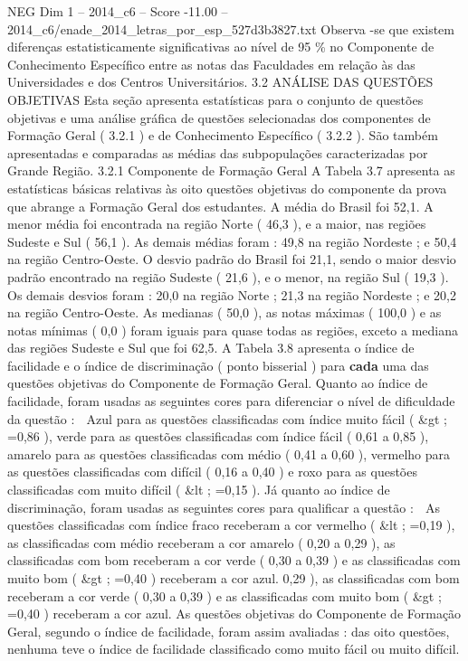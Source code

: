 \begin{textsample}{NEG Dim 1 – 2014\_c6 – Score -11.00 – 2014\_c6/enade\_2014\_letras\_por\_esp\_527d3b3827.txt}
Observa -se que existem diferenças estatisticamente significativas ao nível de 95 \% no Componente de Conhecimento Específico entre as notas das Faculdades em relação às das Universidades e dos Centros Universitários. 3.2 ANÁLISE DAS QUESTÕES OBJETIVAS Esta seção apresenta estatísticas para o conjunto de questões objetivas e uma análise gráfica de questões selecionadas dos componentes de Formação Geral ( 3.2.1 ) e de Conhecimento Específico ( 3.2.2 ).
São também apresentadas e comparadas as médias das subpopulações caracterizadas por Grande Região. 3.2.1 Componente de Formação Geral A Tabela 3.7 apresenta as estatísticas básicas relativas às oito questões objetivas do componente da prova que abrange a Formação Geral dos estudantes.
A média do Brasil foi 52,1.
A menor média foi encontrada na região Norte ( 46,3 ), e a maior, nas regiões Sudeste e Sul ( 56,1 ).
As demais médias foram : 49,8 na região Nordeste ; e 50,4 na região Centro-Oeste.
O desvio padrão do Brasil foi 21,1, sendo o maior desvio padrão encontrado na região Sudeste ( 21,6 ), e o menor, na região Sul ( 19,3 ).
Os demais desvios foram : 20,0 na região Norte ; 21,3 na região Nordeste ; e 20,2 na região Centro-Oeste.
As medianas ( 50,0 ), as notas máximas ( 100,0 ) e as notas mínimas ( 0,0 ) foram iguais para quase todas as regiões, exceto a mediana das regiões Sudeste e Sul que foi 62,5.
A Tabela 3.8 apresenta o índice de facilidade e o índice de discriminação ( ponto bisserial ) para \textbf{cada} uma das questões objetivas do Componente de Formação Geral.
Quanto ao índice de facilidade, foram usadas as seguintes cores para diferenciar o nível de dificuldade da questão :  Azul para as questões classificadas com índice muito fácil ( \&gt ; =0,86 ), verde para as questões classificadas com índice fácil ( 0,61 a 0,85 ), amarelo para as questões classificadas com médio ( 0,41 a 0,60 ), vermelho para as questões classificadas com difícil ( 0,16 a 0,40 ) e roxo para as questões classificadas com muito difícil ( \&lt ; =0,15 ).
Já quanto ao índice de discriminação, foram usadas as seguintes cores para qualificar a questão :  As questões classificadas com índice fraco receberam a cor vermelho ( \&lt ; =0,19 ), as classificadas com médio receberam a cor amarelo ( 0,20 a 0,29 ), as classificadas com bom receberam a cor verde ( 0,30 a 0,39 ) e as classificadas com muito bom ( \&gt ; =0,40 ) receberam a cor azul. 0,29 ), as classificadas com bom receberam a cor verde ( 0,30 a 0,39 ) e as classificadas com muito bom ( \&gt ; =0,40 ) receberam a cor azul.
As questões objetivas do Componente de Formação Geral, segundo o índice de facilidade, foram assim avaliadas : das oito questões, nenhuma teve o índice de facilidade classificado como muito fácil ou muito difícil.

\end{textsample}
